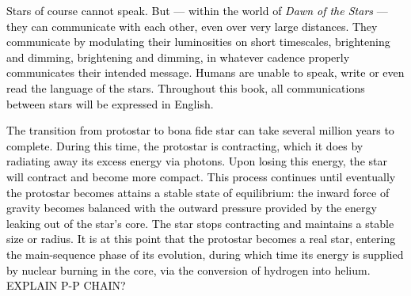 \documentclass[main.tex]{subfiles}
\begin{document}
\begin{tcolorbox}[sharp corners, colback=red!30, colframe=red!80!blue, title=Box \refstepcounter{educhap1}\label{boxchap1:st}\ref{boxchap1:st} -- Stellar Communication]
\par \textcolor{black} {Stars of course cannot speak.  But --- within the world of {\it Dawn of the Stars} --- they can communicate with each other, even over very large distances.  They communicate by modulating their luminosities on short timescales, brightening and dimming, brightening and dimming, in whatever cadence properly communicates their intended message.  Humans are unable to speak, write or even read the language of the stars.  Throughout this book, all communications between stars will be expressed in English.} 
\end{tcolorbox}

\begin{tcolorbox}[sharp corners, colback=red!30, colframe=red!80!blue, title=Box \refstepcounter{educhap1}\label{boxchap1:proto}\ref{boxchap1:proto} -- From Protostar to Bona Fide Star]
\par \textcolor{black} {The transition from protostar to bona fide star can take several million years to complete.  During this time, the protostar is contracting, which it does by radiating away its excess energy via photons.  Upon losing this energy, the star will contract and become more compact.  This process continues until eventually the protostar becomes attains a stable state of equilibrium:  the inward force of gravity becomes balanced with the outward pressure provided by the energy leaking out of the star's core.  The star stops contracting and maintains a stable size or radius.  It is at this point that the protostar becomes a real star, entering the main-sequence phase of its evolution, during which time its energy is supplied by nuclear burning in the core, via the conversion of hydrogen into helium. \\
EXPLAIN P-P CHAIN?}
\end{tcolorbox}
\end{document}
